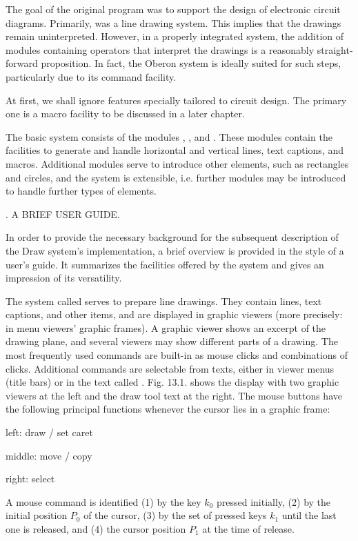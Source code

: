 The goal of the original  program was to support the design of electronic circuit diagrams. Primarily,  was a line drawing system. This implies that the drawings remain uninterpreted. However, in a properly integrated system, the addition of modules containing operators that interpret the drawings is a reasonably straight-forward proposition. In fact, the Oberon system is ideally suited for such steps, particularly due to its command facility.

At first, we shall ignore features specially tailored to circuit design. The primary one is a macro facility to be discussed in a later chapter.

The basic system consists of the modules , , and . These modules contain the facilities to generate and handle horizontal and vertical lines, text captions, and macros. Additional modules serve to introduce other elements, such as rectangles and circles, and the system is extensible, i.e. further modules may be introduced to handle further types of elements.

. A BRIEF USER GUIDE.

In order to provide the necessary background for the subsequent description of the Draw system's implementation, a brief overview is provided in the style of a user's guide. It summarizes the facilities offered by the system and gives an impression of its versatility.

The system called  serves to prepare line drawings. They contain lines, text captions, and other items, and are displayed in graphic viewers (more precisely: in menu viewers' graphic frames). A graphic viewer shows an excerpt of the drawing plane, and several viewers may show different parts of a drawing. The most frequently used commands are built-in as mouse clicks and combinations of clicks. Additional commands are selectable from texts, either in viewer menus (title bars) or in the text called . Fig. 13.1. shows the display with two graphic viewers at the left and the draw tool text at the right. The mouse buttons have the following principal functions whenever the cursor lies in a graphic frame:
{ \medskip \narrower
\item{left:} draw / set caret
\item{middle:} move / copy
\item{right:} select
\medskip }
\noindent A mouse command is identified (1) by the key $k_0$ pressed initially, (2) by the initial position $P_0$ of the cursor, (3) by the set of pressed keys $k_1$ until the last one is released, and (4) the cursor position $P_1$ at the time of release.

